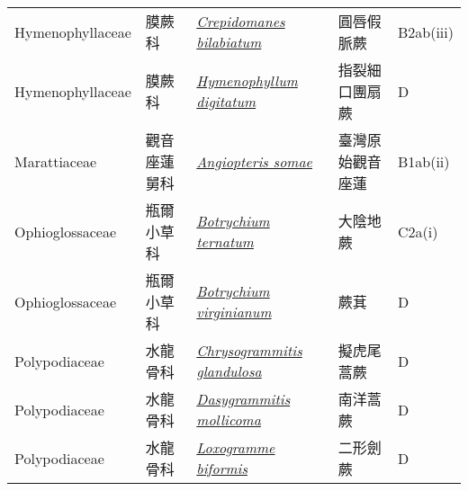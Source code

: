 {\begin{longtable}{L{2.5cm}L{2cm}L{5cm}L{2.5cm}L{3cm}}
    Hymenophyllaceae & 膜蕨科 & \href{http://www.theplantlist.org/tpl1.1/search?q=Crepidomanes+bilabiatum}{\textit{Crepidomanes bilabiatum} } & 圓唇假脈蕨 & B2ab(iii)    \\
    Hymenophyllaceae & 膜蕨科 & \href{http://www.theplantlist.org/tpl1.1/search?q=Hymenophyllum+digitatum}{\textit{Hymenophyllum digitatum} } & 指裂細口團扇蕨 & D    \\
    Marattiaceae & 觀音座蓮舅科 & \href{http://www.theplantlist.org/tpl1.1/search?q=Angiopteris+somae}{\textit{Angiopteris somae} } & 臺灣原始觀音座蓮 & B1ab(ii)    \\
    Ophioglossaceae & 瓶爾小草科 & \href{http://www.theplantlist.org/tpl1.1/search?q=Botrychium+ternatum}{\textit{Botrychium ternatum} } & 大陰地蕨 & C2a(i)    \\
    Ophioglossaceae & 瓶爾小草科 & \href{http://www.theplantlist.org/tpl1.1/search?q=Botrychium+virginianum}{\textit{Botrychium virginianum} } & 蕨萁 & D    \\
    Polypodiaceae & 水龍骨科 & \href{http://www.theplantlist.org/tpl1.1/search?q=Chrysogrammitis+glandulosa}{\textit{Chrysogrammitis glandulosa} } & 擬虎尾蒿蕨 & D    \\
    Polypodiaceae & 水龍骨科 & \href{http://www.theplantlist.org/tpl1.1/search?q=Dasygrammitis+mollicoma}{\textit{Dasygrammitis mollicoma} } & 南洋蒿蕨 & D    \\
    Polypodiaceae & 水龍骨科 & \href{http://www.theplantlist.org/tpl1.1/search?q=Loxogramme+biformis}{\textit{Loxogramme biformis} } & 二形劍蕨 & D    \\

\end{longtable}}

